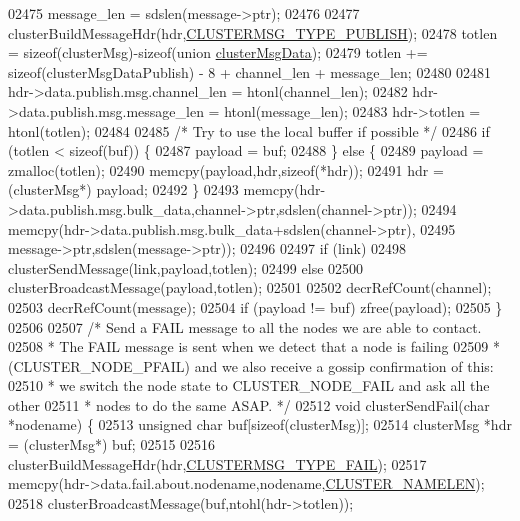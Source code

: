 \begin{DoxyCode}
{{{{{{{{{{{{{{{{{{{{{{{{{{{{{{{{{{{{{{{{02475     message\_len = sdslen(message->ptr);
02476 
02477     clusterBuildMessageHdr(hdr,\hyperlink{cluster_8h_a874fecfd3ff886c2c697f5649ebee5ee}{CLUSTERMSG\_TYPE\_PUBLISH});
02478     totlen = \textcolor{keyword}{sizeof}(clusterMsg)-\textcolor{keyword}{sizeof}(\textcolor{keyword}{union} \hyperlink{unionclusterMsgData}{clusterMsgData});
02479     totlen += \textcolor{keyword}{sizeof}(clusterMsgDataPublish) - 8 + channel\_len + message\_len;
02480 
02481     hdr->data.publish.msg.channel\_len = htonl(channel\_len);
02482     hdr->data.publish.msg.message\_len = htonl(message\_len);
02483     hdr->totlen = htonl(totlen);
02484 
02485     \textcolor{comment}{/* Try to use the local buffer if possible */}
02486     \textcolor{keywordflow}{if} (totlen < \textcolor{keyword}{sizeof}(buf)) \{
02487         payload = buf;
02488     \} \textcolor{keywordflow}{else} \{
02489         payload = zmalloc(totlen);
02490         memcpy(payload,hdr,\textcolor{keyword}{sizeof}(*hdr));
02491         hdr = (clusterMsg*) payload;
02492     \}
02493     memcpy(hdr->data.publish.msg.bulk\_data,channel->ptr,sdslen(channel->ptr));
02494     memcpy(hdr->data.publish.msg.bulk\_data+sdslen(channel->ptr),
02495         message->ptr,sdslen(message->ptr));
02496 
02497     \textcolor{keywordflow}{if} (link)
02498         clusterSendMessage(link,payload,totlen);
02499     \textcolor{keywordflow}{else}
02500         clusterBroadcastMessage(payload,totlen);
02501 
02502     decrRefCount(channel);
02503     decrRefCount(message);
02504     \textcolor{keywordflow}{if} (payload != buf) zfree(payload);
02505 \}
02506 
02507 \textcolor{comment}{/* Send a FAIL message to all the nodes we are able to contact.}
02508 \textcolor{comment}{ * The FAIL message is sent when we detect that a node is failing}
02509 \textcolor{comment}{ * (CLUSTER\_NODE\_PFAIL) and we also receive a gossip confirmation of this:}
02510 \textcolor{comment}{ * we switch the node state to CLUSTER\_NODE\_FAIL and ask all the other}
02511 \textcolor{comment}{ * nodes to do the same ASAP. */}
02512 \textcolor{keywordtype}{void} clusterSendFail(\textcolor{keywordtype}{char} *nodename) \{
02513     \textcolor{keywordtype}{unsigned} \textcolor{keywordtype}{char} buf[\textcolor{keyword}{sizeof}(clusterMsg)];
02514     clusterMsg *hdr = (clusterMsg*) buf;
02515 
02516     clusterBuildMessageHdr(hdr,\hyperlink{cluster_8h_af5d51e3ad9965074b2124aabe1895d59}{CLUSTERMSG\_TYPE\_FAIL});
02517     memcpy(hdr->data.fail.about.nodename,nodename,\hyperlink{cluster_8h_ace7a882972eff7149675252938643b6e}{CLUSTER\_NAMELEN});
02518     clusterBroadcastMessage(buf,ntohl(hdr->totlen));
}}}}}}}}}}}}}}}}}}}}}}}}}}}}}}}}}}}}}}}}
\end{DoxyCode}
